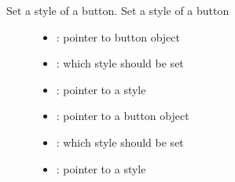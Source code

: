 \documentclass[letterpaper,10pt,english]{sphinxmanual}
\begin{document}

\begin{fulllineitems}
\label{\detokenize{object-types/btn:_CPPv416lv_btn_set_styleP8lv_obj_t14lv_btn_style_tPK10lv_style_t}}%
\pysigstartmultiline
{}\label{\detokenize{object-types/btn:lv__btn_8h_1ace4ffd390ea1ce294268b220e241d10a}}%
\pysigstopmultiline
Set a style of a button. 
Set a style of a button 
\begin{description}
\item[{}] \leavevmode\begin{itemize}
\item {} 
: pointer to button object 

\item {} 
: which style should be set 

\item {} 
: pointer to a style

\end{itemize}

\item[{}] \leavevmode\begin{itemize}
\item {} 
: pointer to a button object 

\item {} 
: which style should be set 

\item {} 
: pointer to a style 

\end{itemize}

\end{description}


\end{fulllineitems}

\end{document}
